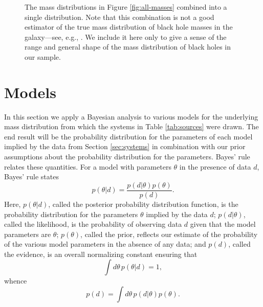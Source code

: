 \documentclass[preprint]{aastex}
\begin{document}
\begin{figure}

  \caption{\label{fig:masses} The mass distributions in Figure
    \ref{fig:all-masses} combined into a single distribution. Note
    that this combination is not a good estimator of the true mass
    distribution of black hole masses in the galaxy---see, e.g.,
    \citet{Mandel2010}.  We include it here only to give a sense of
    the range and general shape of the mass distribution of black
    holes in our sample.}
\end{figure}

\section{Models}
\label{sec:models}

In this section we apply a Bayesian analysis to various models for the
underlying mass distribution from which the systems in Table
\ref{tab:sources} were drawn.  The end result will be the probability
distribution for the parameters of each model implied by the data from
Section \ref{sec:systems} in combination with our prior assumptions
about the probability distribution for the parameters.  Bayes' rule
relates these quantities.  For a model with parameters $\theta$ in the
presence of data $d$, Bayes' rule states
\begin{equation}
  \label{eq:Bayes-rule}
  p(\theta | d) = \frac{p(d | \theta) p(\theta)}{p(d)}.
\end{equation}
Here, $p(\theta|d)$, called the posterior probability distribution
function, is the probability distribution for the parameters $\theta$
implied by the data $d$; $p(d|\theta)$, called the likelihood, is the
probability of observing data $d$ given that the model parameters are
$\theta$; $p(\theta)$, called the prior, reflects our estimate of the
probability of the various model parameters in the absence of any
data; and $p(d)$, called the evidence, is an overall normalizing
constant ensuring that 
\begin{equation}
  \int d\theta\, p(\theta|d) = 1,
\end{equation}
whence
\begin{equation}
  \label{eq:evidence-def}
  p(d) = \int d\theta\, p(d|\theta) p(\theta).
\end{equation}
\end{document}

